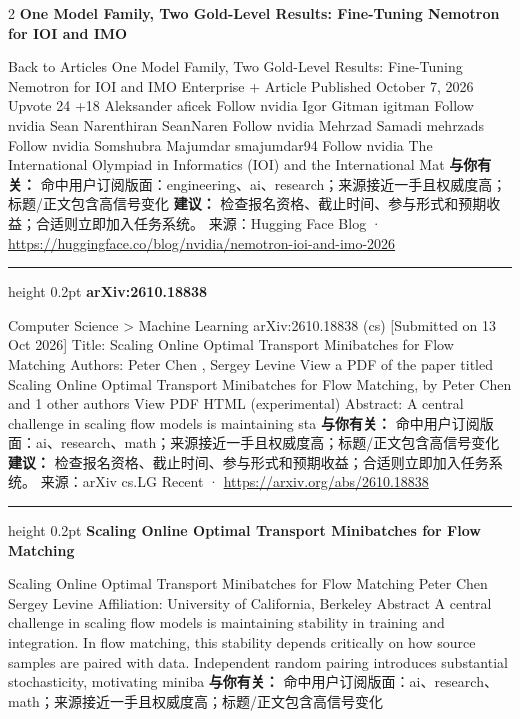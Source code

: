 \documentclass[10.5pt]{ctexart}
\begin{document}
\begin{multicols}{2}
{\large\bfseries One Model Family, Two Gold-Level Results: Fine-Tuning Nemotron for IOI and IMO}\par
Back to Articles One Model Family, Two Gold-Level Results: Fine-Tuning Nemotron for IOI and IMO Enterprise + Article Published October 7, 2026 Upvote 24 +18 Aleksander aficek Follow nvidia Igor Gitman igitman Follow nvidia Sean Narenthiran SeanNaren Follow nvidia Mehrzad Samadi mehrzads Follow nvidia Somshubra Majumdar smajumdar94 Follow nvidia The International Olympiad in Informatics (IOI) and the International Mat
\textbf{与你有关：} 命中用户订阅版面：engineering、ai、research；来源接近一手且权威度高；标题/正文包含高信号变化
\textbf{建议：} 检查报名资格、截止时间、参与形式和预期收益；合适则立即加入任务系统。
{\footnotesize\color{ormuted} 来源：Hugging Face Blog · \url{https://huggingface.co/blog/nvidia/nemotron-ioi-and-imo-2026}}
\vspace{2mm}
\hrule height 0.2pt
\vspace{2mm}
{\large\bfseries arXiv:2610.18838}\par
Computer Science > Machine Learning arXiv:2610.18838 (cs) [Submitted on 13 Oct 2026] Title: Scaling Online Optimal Transport Minibatches for Flow Matching Authors: Peter Chen , Sergey Levine View a PDF of the paper titled Scaling Online Optimal Transport Minibatches for Flow Matching, by Peter Chen and 1 other authors View PDF HTML (experimental) Abstract: A central challenge in scaling flow models is maintaining sta
\textbf{与你有关：} 命中用户订阅版面：ai、research、math；来源接近一手且权威度高；标题/正文包含高信号变化
\textbf{建议：} 检查报名资格、截止时间、参与形式和预期收益；合适则立即加入任务系统。
{\footnotesize\color{ormuted} 来源：arXiv cs.LG Recent · \url{https://arxiv.org/abs/2610.18838}}
\vspace{2mm}
\hrule height 0.2pt
\vspace{2mm}
{\large\bfseries Scaling Online Optimal Transport Minibatches for Flow Matching}\par
Scaling Online Optimal Transport Minibatches for Flow Matching Peter Chen Sergey Levine Affiliation: University of California, Berkeley Abstract A central challenge in scaling flow models is maintaining stability in training and integration. In flow matching, this stability depends critically on how source samples are paired with data. Independent random pairing introduces substantial stochasticity, motivating miniba
\textbf{与你有关：} 命中用户订阅版面：ai、research、math；来源接近一手且权威度高；标题/正文包含高信号变化

\end{multicols}
\end{document}
